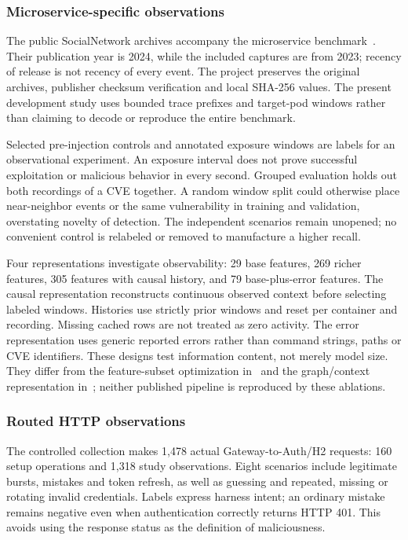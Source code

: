 \documentclass[conference,a4paper]{IEEEtran}
\begin{document}
\subsubsection{Microservice-specific observations}
The public SocialNetwork archives accompany the microservice benchmark~\cite{flora,dataset}. Their publication year is 2024, while the included captures are from 2023; recency of release is not recency of every event. The project preserves the original archives, publisher checksum verification and local SHA-256 values. The present development study uses bounded trace prefixes and target-pod windows rather than claiming to decode or reproduce the entire benchmark.

Selected pre-injection controls and annotated exposure windows are labels for an observational experiment. An exposure interval does not prove successful exploitation or malicious behavior in every second. Grouped evaluation holds out both recordings of a CVE together. A random window split could otherwise place near-neighbor events or the same vulnerability in training and validation, overstating novelty of detection. The independent scenarios remain unopened; no convenient control is relabeled or removed to manufacture a higher recall.

Four representations investigate observability: 29 base features, 269 richer features, 305 features with causal history, and 79 base-plus-error features. The causal representation reconstructs continuous observed context before selecting labeled windows. Histories use strictly prior windows and reset per container and recording. Missing cached rows are not treated as zero activity. The error representation uses generic reported errors rather than command strings, paths or CVE identifiers. These designs test information content, not merely model size. They differ from the feature-subset optimization in~\cite{feature} and the graph/context representation in~\cite{sage}; neither published pipeline is reproduced by these ablations.

\subsubsection{Routed HTTP observations}
The controlled collection makes 1,478 actual Gateway-to-Auth/H2 requests: 160 setup operations and 1,318 study observations. Eight scenarios include legitimate bursts, mistakes and token refresh, as well as guessing and repeated, missing or rotating invalid credentials. Labels express harness intent; an ordinary mistake remains negative even when authentication correctly returns HTTP 401. This avoids using the response status as the definition of maliciousness.
\end{document}
